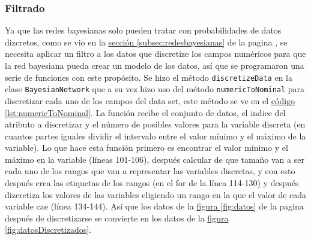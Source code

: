 \subsubsection{Filtrado}
\label{sec:filtrado}
Ya que las redes bayesianas solo pueden tratar con probabilidades de datos dizcretos, como se vio en la 
\hyperref[subsec:redesbayesianas]{ sección \ref{subsec:redesbayesianas}} de la pagina \pageref{subsec:redesbayesianas}, se necesita aplicar un filtro a los datos que discretize los campos numéricos para que la red bayesiana pueda crear un modelo de los datos, así que se programaron una serie de funciones con este propósito. Se hizo el método \texttt{discretizeData} en la clase \texttt{BayesianNetwork} que a su vez hizo uso del método \texttt{numericToNominal} para discretizar cada uno de los campos del data set, este método se ve en el  \hyperref[lst:numericToNominal]{código \ref{lst:numericToNominal}}.
La función recibe el conjunto de datos, el indice del atributo a discretizar y el número de posibles valores para la variable discreta (en cuantos partes iguales dividir el intervalo entre el valor mínimo y el máximo de la variable).
Lo que hace esta función primero es encontrar el valor mínimo y el máximo en la variable (líneas 101-106), después calcular de que tamaño van a ser cada uno de los rangos que van a representar las variables discretas, y con esto después crea las etiquetas de los rangos (en el for de la línea 114-130) y después dizcretiza los valores de las variables eligiendo un rango en la que el valor de cada variable cae (línea 134-144).
Así que los datos de la \hyperref[fig:datos]{figura \ref{fig:datos}} de la pagina \pageref{fig:datos} después de discretizarse se convierte en los datos de la \hyperref[fig:datosDiscretizados]{figura \ref{fig:datosDiscretizados}}. 


